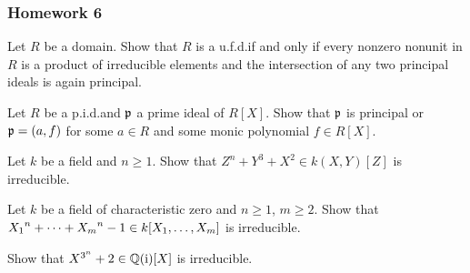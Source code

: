 \subsubsection{Homework 6}
\setcounter{exercise}{0}
\setcounter{equation}{0}

\begin{problem}
  Let \(R\) be a domain. Show that \(R\) is a u.f.d.\@ if and only if every
  nonzero nonunit in \(R\) is a product of irreducible elements and the
  intersection of any two principal ideals is again principal.
\end{problem}
\begin{solution}
\end{solution}

\begin{problem}
  Let \(R\) be a p.i.d.\@ and \(\mathfrak{p}\) a prime ideal of \(R[X]\). Show
  that \(\mathfrak{p}\) is principal or \(\mathfrak{p}=(a,f)\) for some \(a\in R\) and
  some monic polynomial \(f\in R[X]\).
\end{problem}
\begin{solution}
\end{solution}

\begin{problem}
  Let \(k\) be a field and \(n\geq 1\). Show that
  \(Z^n+Y^3+X^2\in k(X,Y)[Z]\) is irreducible.
\end{problem}
\begin{solution}
\end{solution}

\begin{problem}
  Let \(k\) be a field of characteristic zero and \(n\geq 1\), \(m\geq
  2\). Show that \({X_1}^{\cramped{n}}+\dotsb+{X_m}^{\cramped{n}}-1\in
  k[X_1,\dotsc,X_m]\) is
  irreducible.
\end{problem}
\begin{solution}
\end{solution}

\begin{problem}
  Show that \(X^{3^n}+2\in\mathbb{Q}(\mathrm{i})[X]\) is irreducible.
\end{problem}
\begin{solution}
\end{solution}

